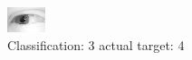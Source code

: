 \begin{figure}[h!]
\begin{center}
\includegraphics[width=0.60\columnwidth]{figures/ID2416_class_3_target_4.png}
\end{center}
\caption{ Classification: 3 actual target: 4}
\label{fig:ID2416_class_3_target_4}
\end{figure}
